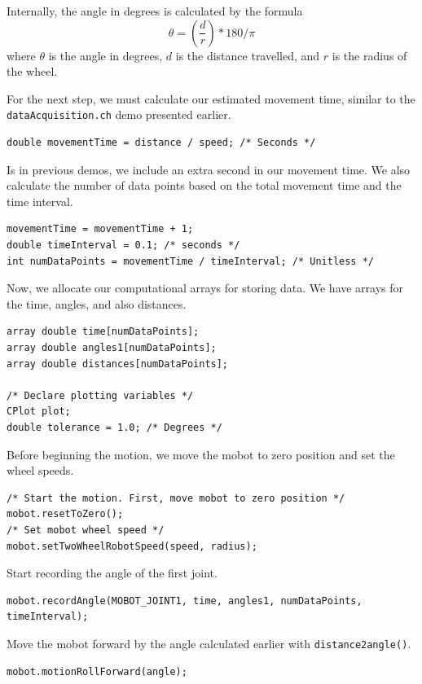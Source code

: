 \documentclass{article}
\begin{document}
Internally, the angle in degrees is calculated by the formula
\begin{equation*}
\theta  = \left(\frac{d}{r} \right) * 180 / \pi
\end{equation*}
where $\theta$ is the angle in degrees, $d$ is the distance travelled, 
and $r$ is the radius of the wheel.

For the next step, we must calculate our estimated movement time, similar to the
\texttt{dataAcquisition.ch} demo presented earlier. 
\begin{verbatim}
double movementTime = distance / speed; /* Seconds */
\end{verbatim}

Is in previous demos, we include an extra second in our movement time. We
also calculate the number of data points based on the total movement time
and the time interval.
\begin{verbatim}
movementTime = movementTime + 1; 
double timeInterval = 0.1; /* seconds */
int numDataPoints = movementTime / timeInterval; /* Unitless */
\end{verbatim}

Now, we allocate our computational arrays for storing data. We have arrays 
for the time, angles, and also distances.
\begin{verbatim}
array double time[numDataPoints];
array double angles1[numDataPoints];
array double distances[numDataPoints];

/* Declare plotting variables */
CPlot plot;
double tolerance = 1.0; /* Degrees */
\end{verbatim}

Before beginning the motion, we move the mobot to zero position and set the 
wheel speeds.
\begin{verbatim}
/* Start the motion. First, move mobot to zero position */
mobot.resetToZero();
/* Set mobot wheel speed */
mobot.setTwoWheelRobotSpeed(speed, radius);
\end{verbatim}

Start recording the angle of the first joint.
\begin{verbatim}
mobot.recordAngle(MOBOT_JOINT1, time, angles1, numDataPoints, timeInterval);
\end{verbatim}

Move the mobot forward by the angle calculated earlier with \texttt{distance2angle()}.
\begin{verbatim}
mobot.motionRollForward(angle);
\end{verbatim}
\end{document}
